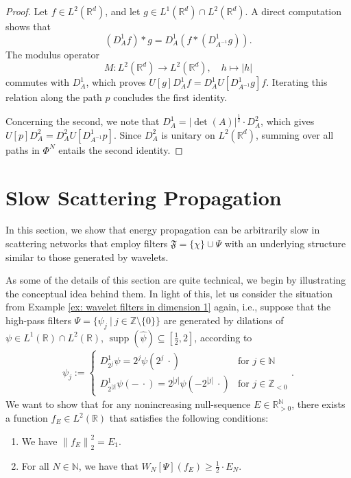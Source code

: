 \documentclass[11pt]{amsart}
\newcommand{\R}{{\mathbb{R}}}
\newcommand{\N}{\mathbb{N}}
\newcommand{\Z}{\mathbb{Z}}
\newcommand{\norm}[1]{\ensuremath{\left\lVert\text{}#1\text{}\right\rVert}}
\DeclareMathOperator{\supp}{supp}
\newenvironment{proof sketch} {\textit{Proof sketch.}}{}
\newenvironment{myenum}
{ \begin{enumerate}
    \setlength{\itemsep}{3pt}
    \setlength{\parskip}{0pt}
    \setlength{\parsep}{0pt}     }
{ \end{enumerate}                  }
\begin{document}
  \begin{proof}
    Let $f \in L^2(\R^d)$, and let $g \in L^1(\R^d)\cap L^2(\R^d)$. A direct computation shows that 
    \[(D_A^1f)*g=D_A^1(f*(D_{A^{-1}}^1g)).\]
    The modulus operator 
    \[M:L^2(\R^d)\to L^2(\R^d), \quad h \mapsto |h|\] 
    commutes with $D_A^1$, which proves $U[g]D_A^1f=D_A^1U[D_{A^{-1}}^1g]f$. Iterating this relation along the path $p$ concludes the first identity.
    
    Concerning the second, we note that $D_A^1= |\det(A)|^{\frac{1}{2}}\cdot D_A^2$, which gives $U[p]D_A^2=D_A^2U[D_{A^{-1}}^1p]$. Since $D_A^2$ is unitary on $L^2(\R^d)$, summing over all paths in $\Phi^N$ entails the second identity.
  \end{proof}
  \section{Slow Scattering Propagation}\label{sec: Slow Scattering Propagation}
  
  In this section, we show that energy propagation can be arbitrarily slow in scattering networks that employ filters $\mathfrak{F}=\{\chi\}\cup \Psi$ with an underlying structure similar to those generated by wavelets.
  
  As some of the details of this section are quite technical, we begin by illustrating the conceptual idea behind them. In light of this, let us consider the situation from Example \ref{ex: wavelet filters in dimension 1} again, i.e., suppose that the high-pass filters $\Psi=\{\psi_j ~|~ j \in \Z\setminus \{0\}\}$ are generated by dilations of $\psi \in L^1(\R)\cap L^2(\R)$, $\supp(\widehat{\psi})\subseteq [\frac{1}{2},2]$, according to
  \begin{align*}
    \psi_j:=
    \begin{cases}
      D^1_{2^j}\psi=2^j \psi(2^j\:\cdot) & \text{for } j \in \N \\
      D^1_{2^{|j|}}\psi(-\:\cdot)=2^{|j|} \psi(-2^{|j|}\:\cdot) &\text{for } j \in \Z_{<0}
    \end{cases}.
  \end{align*}
  We want to show that for any nonincreasing null-sequence $E\in \R_{>0}^\N$, there exists a function $f_E\in L^2(\R)$ that satisfies the following conditions:
  \begin{myenum}
    \item[a)] We have $\norm{f_E}_2^2=E_1$.
    \item[b)] For all $N \in \N$, we have that $W_N[\Psi](f_E)\geq \frac{1}{2}\cdot E_N$.
  \end{myenum}
  
\end{document}
